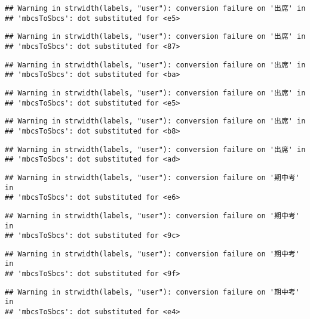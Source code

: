 \documentclass[
]{book}
\begin{document}
\begin{verbatim}
## Warning in strwidth(labels, "user"): conversion failure on '出席' in
## 'mbcsToSbcs': dot substituted for <e5>
\end{verbatim}

\begin{verbatim}
## Warning in strwidth(labels, "user"): conversion failure on '出席' in
## 'mbcsToSbcs': dot substituted for <87>
\end{verbatim}

\begin{verbatim}
## Warning in strwidth(labels, "user"): conversion failure on '出席' in
## 'mbcsToSbcs': dot substituted for <ba>
\end{verbatim}

\begin{verbatim}
## Warning in strwidth(labels, "user"): conversion failure on '出席' in
## 'mbcsToSbcs': dot substituted for <e5>
\end{verbatim}

\begin{verbatim}
## Warning in strwidth(labels, "user"): conversion failure on '出席' in
## 'mbcsToSbcs': dot substituted for <b8>
\end{verbatim}

\begin{verbatim}
## Warning in strwidth(labels, "user"): conversion failure on '出席' in
## 'mbcsToSbcs': dot substituted for <ad>
\end{verbatim}

\begin{verbatim}
## Warning in strwidth(labels, "user"): conversion failure on '期中考' in
## 'mbcsToSbcs': dot substituted for <e6>
\end{verbatim}

\begin{verbatim}
## Warning in strwidth(labels, "user"): conversion failure on '期中考' in
## 'mbcsToSbcs': dot substituted for <9c>
\end{verbatim}

\begin{verbatim}
## Warning in strwidth(labels, "user"): conversion failure on '期中考' in
## 'mbcsToSbcs': dot substituted for <9f>
\end{verbatim}

\begin{verbatim}
## Warning in strwidth(labels, "user"): conversion failure on '期中考' in
## 'mbcsToSbcs': dot substituted for <e4>
\end{verbatim}
\end{document}
